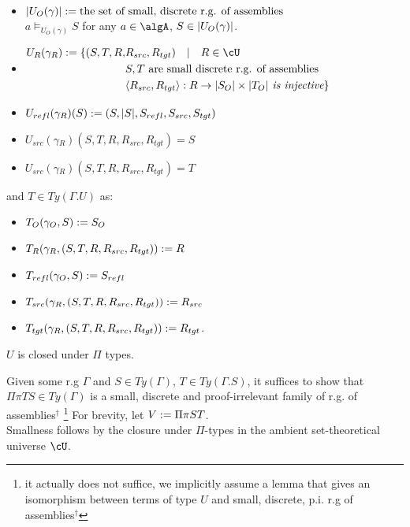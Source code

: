 \documentclass[12pt,a4paper]{article}
\def\src{_{src}}\alwaysmath{src}
\def\rfl{_{refl}}\alwaysmath{rfl}
\def\tgt{_{tgt}}\alwaysmath{tgt}
\renewcommand{\O}{_{O}}
\newcommand{\R}{\ensuremath{_{R}}}
\begin{document}
\begin{itemize}
  \item $\carr{U\O(\gamma)} \define \text{the set of small, discrete r.g. of assemblies}$ \\
   $a \vDash_{U\O(\gamma)} S$ for any $a \in \algA$, $S \in \carr{U\O(\gamma)}$. 
   
  \item $\begin{aligned}
  U\R(\gamma\R) \define \{(S,T, R, & R\src, R\tgt) \quad|\quad R \in \cU \\
  & S,T \text{ are small discrete r.g. of assemblies} \\
  & \langle R\src, R\tgt\rangle : R \to \carr{S\O} \times \carr{T\O} \textit { is injective} \}
  \end{aligned}$
  
  \item $U\rfl(\gamma\R)(S) \define (S, \carr{S}, S\rfl, S\src, S\tgt)$
  
  \item $U\src(\gamma\R)(S, T, R, R\src, R\tgt) = S$
  
  \item $U\src(\gamma\R)(S, T, R, R\src, R\tgt) = T$
\end{itemize}
and $T \in Ty(\Gamma . U)$ as:
\begin{itemize}
  \item $T\O(\gamma\O, S) \define S\O$
  \item $T\R(\gamma\R, (S,T, R, R\src, R\tgt)) \define R$
  \item $T\rfl(\gamma\O, S) \define S\rfl$
  \item $T\src(\gamma\R, (S,T, R, R\src, R\tgt)) \define R\src$
  \item $T\tgt(\gamma\R, (S,T, R, R\src, R\tgt)) \define R\tgt$.
\end{itemize}
\begin{claim} $U$ is closed under $\Pi$ types.
\end{claim}
Given some r.g $\Gamma$ and $S \in Ty(\Gamma)$, $T \in Ty(\Gamma.S)$, it suffices to show that $\Pi \pi T S \in Ty(\Gamma)$ is a small, discrete and proof-irrelevant family of r.g. of assemblies$^\dagger$ \footnote{it actually does not suffice, we implicitly assume a lemma that gives an isomorphism between terms of type $U$ and small, discrete, p.i. r.g of assemblies$^\dagger$} For brevity, let $V := \Pi \pi S T$.\\

Smallness follows by the closure under $\Pi$-types in the ambient set-theoretical universe $\cU$.\\
\end{document}
